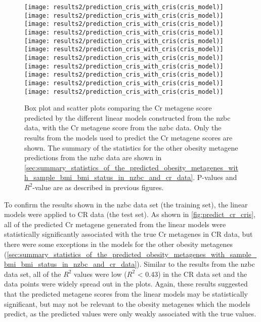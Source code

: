 \begin{figure}[htpb]
	\centering
	\texttt{[image: results2/prediction\_cris\_with\_cris(cris\_model)]}
	\texttt{[image: results2/prediction\_cris\_with\_cris(cris\_model)]}
	\texttt{[image: results2/prediction\_cris\_with\_cris(cris\_model)]}
	\texttt{[image: results2/prediction\_cris\_with\_cris(cris\_model)]}
	\texttt{[image: results2/prediction\_cris\_with\_cris(cris\_model)]}
	\texttt{[image: results2/prediction\_cris\_with\_cris(cris\_model)]}
	\texttt{[image: results2/prediction\_cris\_with\_cris(cris\_model)]}
	\texttt{[image: results2/prediction\_cris\_with\_cris(cris\_model)]}
	\texttt{[image: results2/prediction\_cris\_with\_cris(cris\_model)]}
	\texttt{[image: results2/prediction\_cris\_with\_cris(cris\_model)]}
	\texttt{[image: results2/prediction\_cris\_with\_cris(cris\_model)]}
	\caption[Comparison of the predicted Cr metagene scores with the Cr metagene score from the \gls{nzbc} data]{ Box plot and scatter plots comparing the Cr metagene score predicted by the different linear models constructed from the \gls{nzbc} data, with the Cr metagene score from the \gls{nzbc} data.
	Only the results from the models used to predict the Cr metagene scores are shown.
	The summary of the statistics for the other obesity metagene predictions from the \gls{nzbc} data are shown in \cref{sec:summary_statistics_of_the_predicted_obesity_metagenes_with_sample_bmi_bmi_status_in_nzbc_and_cr_data}.
	P-values and $R^2$-value are as described in previous figures.
	}
	\label{fig:predict_cris_cris}
\end{figure}

To confirm the results shown in the \gls{nzbc} data set (the training set), the linear models were applied to CR data (the test set).
As shown in \cref{fig:predict_cr_cris}, all of the predicted Cr metagene generated from the linear models were statistically significantly associated with the true Cr metagenes in CR data, but there were some exceptions in the models for the other obesity metagenes (\cref{sec:summary_statistics_of_the_predicted_obesity_metagenes_with_sample_bmi_bmi_status_in_nzbc_and_cr_data}).
Similar to the results from the \gls{nzbc} data set, all of the $R^2$ values were low ($R^2$ \textless{} 0.43) in the CR data set and the data points were widely spread out in the plots.
Again, these results suggested that the predicted metagene scores from the linear models may be statistically significant, but may not be relevant to the obesity metagenes which the models predict, as the predicted values were only weakly associated with the true values.

